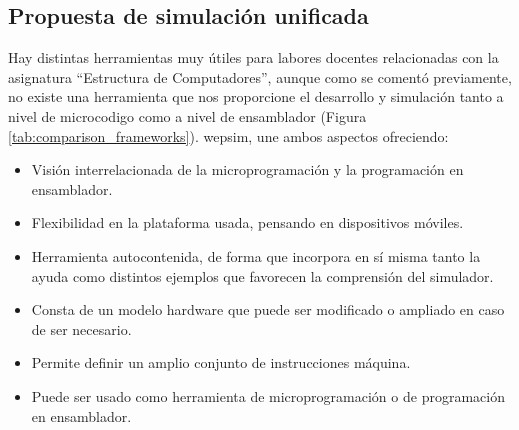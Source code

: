 \clearpage

\subsection{Propuesta de simulación unificada}
\label{sec:propuesta_simulacion}
Hay distintas herramientas muy útiles para labores docentes relacionadas con la asignatura ``Estructura de Computadores'', aunque como se comentó previamente, no existe una herramienta que nos proporcione el desarrollo y simulación tanto a nivel de \gls{microcodigo} como a nivel de \gls{ensamblador} (Figura \ref{tab:comparison_frameworks}). \acrshort{wepsim}, une ambos aspectos ofreciendo:

\begin{itemize}
	\item Visión interrelacionada de la microprogramación y la programación en \gls{ensamblador}.
	\item Flexibilidad en la plataforma usada, pensando en dispositivos móviles.
	\item Herramienta autocontenida, de forma que incorpora en sí misma tanto la ayuda como distintos ejemplos que favorecen la comprensión del simulador.
	\item Consta de un modelo \gls{hardware} que puede ser modificado o ampliado en caso de ser necesario.
	\item Permite definir un amplio conjunto de instrucciones máquina.
	\item Puede ser usado como herramienta de microprogramación o de programación en \gls{ensamblador}.
\end{itemize}

\begin{table}[htbp]
\centering
\caption{Comparación de simuladores de \gls{ensamblador} y \gls{microcodigo}.}
\label{tab:comparison_frameworks}
\end{table}

